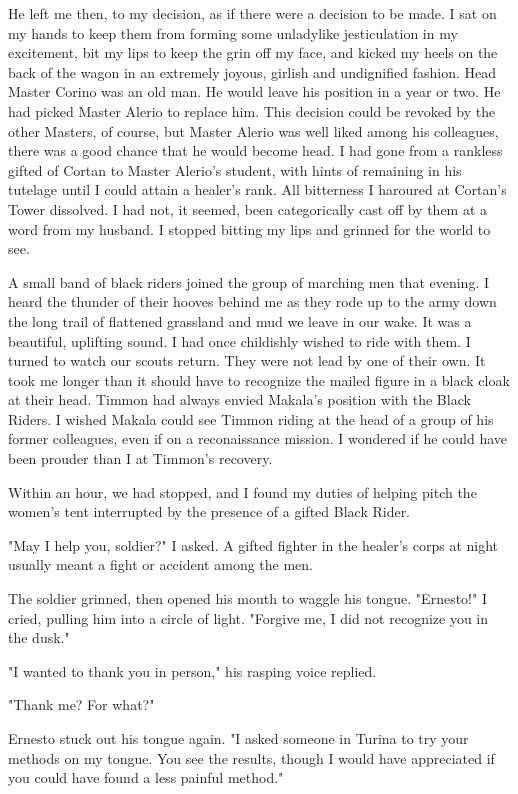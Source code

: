\documentclass{article}
\begin{document}
He left me then, to my decision, as if there were a decision to be made. I sat on my hands to keep them from forming some unladylike jesticulation in my excitement, bit my lips to keep the grin off my face, and kicked my heels on the back of the wagon in an extremely joyous, girlish and undignified fashion. Head Master Corino was an old man. He would leave his position in a year or two. He had picked Master Alerio to replace him. This decision could be revoked by the other Masters, of course, but Master Alerio was well liked among his colleagues, there was a good chance that he would become head. I had gone from a rankless gifted of Cortan to Master Alerio's student, with hints of remaining in his tutelage until I could attain a healer's rank. All bitterness I haroured at Cortan's Tower dissolved. I had not, it seemed, been categorically cast off by them at a word from my husband. I stopped bitting my lips and grinned for the world to see.

A small band of black riders joined the group of marching men that evening. I heard the thunder of their hooves behind me as they rode up to the army down the long trail of flattened grassland and mud we leave in our wake. It was a beautiful, uplifting sound. I had once childishly wished to ride with them. I turned to watch our scouts return. They were not lead by one of their own. It took me longer than it should have to recognize the mailed figure in a black cloak at their head. Timmon had always envied Makala's position with the Black Riders. I wished Makala could see Timmon riding at the head of a group of his former colleagues, even if on a reconaissance mission. I wondered if he could have been prouder than I at Timmon's recovery.

Within an hour, we had stopped, and I found my duties of helping pitch the women's tent interrupted by the presence of a gifted Black Rider. 

"May I help you, soldier?" I asked. A gifted fighter in the healer's corps at night usually meant a fight or accident among the men. 

The soldier grinned, then opened his mouth to waggle his tongue. "Ernesto!" I cried, pulling him into a circle of light. "Forgive me, I did not recognize you in the dusk."

"I wanted to thank you in person," his rasping voice replied.

"Thank me? For what?"

Ernesto stuck out his tongue again. "I asked someone in Turina to try your methods on my tongue. You see the results, though I would have appreciated if you could have found a less painful method." 
\end{document}
